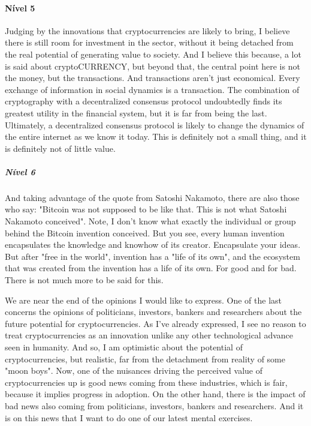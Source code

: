 \paragraph{Nível 5}
Judging by the innovations that cryptocurrencies are likely to bring, I believe there is still room for investment in the sector, without it being detached from the real potential of generating value to society. And I believe this because, a lot is said about cryptoCURRENCY, but beyond that, the central point here is not the money, but the transactions. And transactions aren't just economical. Every exchange of information in social dynamics is a transaction. The combination of cryptography with a decentralized consensus protocol undoubtedly finds its greatest utility in the financial system, but it is far from being the last. Ultimately, a decentralized consensus protocol is likely to change the dynamics of the entire internet as we know it today. This is definitely not a small thing, and it is definitely not of little value.

\subparagraph{Nível 6}
And taking advantage of the quote from Satoshi Nakamoto, there are also those who say: "Bitcoin was not supposed to be like that. This is not what Satoshi Nakamoto conceived". Note, I don't know what exactly the individual or group behind the Bitcoin invention conceived. But you see, every human invention encapsulates the knowledge and knowhow of its creator. Encapsulate your ideas. But after "free in the world", invention has a "life of its own", and the ecosystem that was created from the invention has a life of its own. For good and for bad. There is not much more to be said for this.

We are near the end of the opinions I would like to express. One of the last concerns the opinions of politicians, investors, bankers and researchers about the future potential for cryptocurrencies. As I've already expressed, I see no reason to treat cryptocurrencies as an innovation unlike any other technological advance seen in humanity. And so, I am optimistic about the potential of cryptocurrencies, but realistic, far from the detachment from reality of some "moon boys". Now, one of the nuisances driving the perceived value of cryptocurrencies up is good news coming from these industries, which is fair, because it implies progress in adoption. On the other hand, there is the impact of bad news also coming from politicians, investors, bankers and researchers. And it is on this news that I want to do one of our latest mental exercises.

